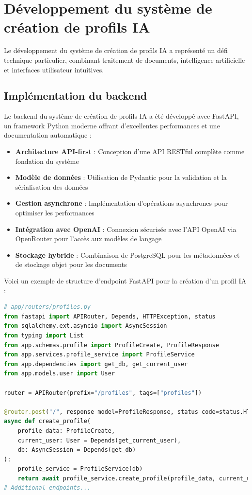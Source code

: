 \section{Développement du système de création de profils IA}

Le développement du système de création de profils IA a représenté un défi technique particulier, combinant traitement de documents, intelligence artificielle et interfaces utilisateur intuitives.

\subsection{Implémentation du backend}

Le backend du système de création de profils IA a été développé avec FastAPI, un framework Python moderne offrant d'excellentes performances et une documentation automatique :

\begin{itemize}
  \item \textbf{Architecture API-first} : Conception d'une API RESTful complète comme fondation du système
  
  \item \textbf{Modèle de données} : Utilisation de Pydantic pour la validation et la sérialisation des données
  
  \item \textbf{Gestion asynchrone} : Implémentation d'opérations asynchrones pour optimiser les performances
  
  \item \textbf{Intégration avec OpenAI} : Connexion sécurisée avec l'API OpenAI via OpenRouter pour l'accès aux modèles de langage
  
  \item \textbf{Stockage hybride} : Combinaison de PostgreSQL pour les métadonnées et de stockage objet pour les documents
\end{itemize}

Voici un exemple de structure d'endpoint FastAPI pour la création d'un profil IA :

\begin{lstlisting}[style=codestyle, language=Python]
# app/routers/profiles.py
from fastapi import APIRouter, Depends, HTTPException, status
from sqlalchemy.ext.asyncio import AsyncSession
from typing import List
from app.schemas.profile import ProfileCreate, ProfileResponse
from app.services.profile_service import ProfileService
from app.dependencies import get_db, get_current_user
from app.models.user import User

router = APIRouter(prefix="/profiles", tags=["profiles"])

@router.post("/", response_model=ProfileResponse, status_code=status.HTTP_201_CREATED)
async def create_profile(
    profile_data: ProfileCreate,
    current_user: User = Depends(get_current_user),
    db: AsyncSession = Depends(get_db)
):
    profile_service = ProfileService(db)
    return await profile_service.create_profile(profile_data, current_user.id)
# Additional endpoints...
\end{lstlisting}

